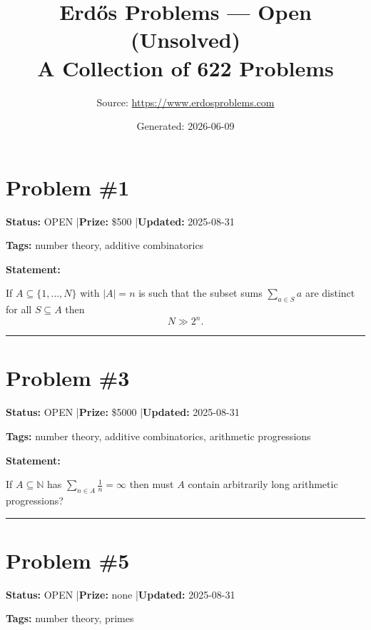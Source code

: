 \documentclass{article}
\title{Erd\H{o}s Problems --- Open (Unsolved)\\[0.5em]\large A Collection of 622 Problems}
\date{Generated: 2026-06-09}
\author{Source: \url{https://www.erdosproblems.com}}
\begin{document}
\maketitle
\tableofcontents
\newpage


\section{Problem \#1}
\label{prob:1}

\noindent\textbf{Status:} OPEN \quad|\quad \textbf{Prize:} \$500 \quad|\quad \textbf{Updated:} 2025-08-31

\noindent\textbf{Tags:} number theory, additive combinatorics

\medskip

\noindent\textbf{Statement:}

If $A\subseteq \{1,\ldots,N\}$ with $\lvert A\rvert=n$ is such that the subset sums $\sum_{a\in S}a$ are distinct for all $S\subseteq A$ then\[N \gg 2^{n}.\]

\noindent\rule{\linewidth}{0.4pt}


\section{Problem \#3}
\label{prob:3}

\noindent\textbf{Status:} OPEN \quad|\quad \textbf{Prize:} \$5000 \quad|\quad \textbf{Updated:} 2025-08-31

\noindent\textbf{Tags:} number theory, additive combinatorics, arithmetic progressions

\medskip

\noindent\textbf{Statement:}

If $A\subseteq \mathbb{N}$ has $\sum_{n\in A}\frac{1}{n}=\infty$ then must $A$ contain arbitrarily long arithmetic progressions?

\noindent\rule{\linewidth}{0.4pt}


\section{Problem \#5}
\label{prob:5}

\noindent\textbf{Status:} OPEN \quad|\quad \textbf{Prize:} none \quad|\quad \textbf{Updated:} 2025-08-31

\noindent\textbf{Tags:} number theory, primes
\end{document}
